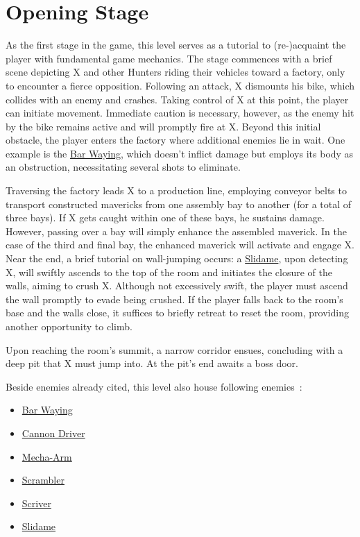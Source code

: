 \section{Opening Stage}
As the first stage in the game, this level serves as a tutorial to (re-)acquaint the player with fundamental game mechanics. The stage commences with a brief scene depicting X and other Hunters riding their vehicles toward a factory, only to encounter a fierce opposition. Following an attack, X dismounts his bike, which collides with an enemy and crashes. Taking control of X at this point, the player can initiate movement. Immediate caution is necessary, however, as the enemy hit by the bike remains active and will promptly fire at X. Beyond this initial obstacle, the player enters the factory where additional enemies lie in wait. One example is the \hyperlink{enem:Bar_Waying}{Bar Waying}, which doesn't inflict damage but employs its body as an obstruction, necessitating several shots to eliminate.

Traversing the factory leads X to a production line, employing conveyor belts to transport constructed mavericks from one assembly bay to another (for a total of three bays). If X gets caught within one of these bays, he sustains damage. However, passing over a bay will simply enhance the assembled maverick. In the case of the third and final bay, the enhanced maverick will activate and engage X. Near the end, a brief tutorial on wall-jumping occurs: a \hyperlink{enem:Slidame}{Slidame}, upon detecting X, will swiftly ascends to the top of the room and initiates the closure of the walls, aiming to crush X. Although not excessively swift, the player must ascend the wall promptly to evade being crushed. If the player falls back to the room's base and the walls close, it suffices to briefly retreat to reset the room, providing another opportunity to climb.

Upon reaching the room's summit, a narrow corridor ensues, concluding with a deep pit that X must jump into. At the pit's end awaits a boss door.

Beside enemies already cited, this level also house following enemies~\cite{wiki:X2_opening}:
\begin{itemize}
	\item \hyperlink{enem:Bar_Waying}{Bar Waying}
	\item \hyperlink{enem:Cannon_Driver}{Cannon Driver}
	\item \hyperlink{enem:Mecha-Arm}{Mecha-Arm}
	\item \hyperlink{enem:Scrambler}{Scrambler}
	\item \hyperlink{enem:Scriver}{Scriver}
	\item \hyperlink{enem:Slidame}{Slidame}
\end{itemize}

